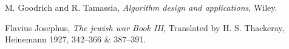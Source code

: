 \documentclass{article}
\newcommand{\Z}{\mathbb{Z}}
\newcommand{\md}{{\mathrm{mod}}}
\begin{document}
%
%
%


\newpage
\begin{thebibliography}{100}

 M. Goodrich and  R. Tamassia, \emph{Algorithm design and applications}, Wiley. 


  Flavius Josephus, \emph{The jewish war  Book III},  Translated by H. S. Thackeray,  Heinemann 1927,
342--366 \& 387--391.
 \end{thebibliography}            
\end{document}

